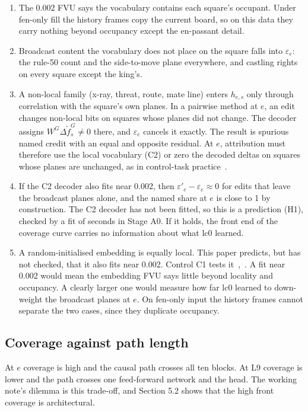 \documentclass[conference]{IEEEtran}
\begin{document}
\begin{enumerate}
\item The 0.002 FVU says the vocabulary contains each square's occupant. Under fen-only fill the history frames copy the current board, so on this data they carry nothing beyond occupancy except the en-passant detail.
\item Broadcast content the vocabulary does not place on the square falls into $\varepsilon_e$: the rule-50 count and the side-to-move plane everywhere, and castling rights on every square except the king's.
\item A non-local family (x-ray, threat, route, mate line) enters $h_{e,s}$ only through correlation with the square's own planes. In a pairwise method at $e$, an edit changes non-local bits on squares whose planes did not change. The decoder assigns $W^G\Delta\tilde f^G_s\neq0$ there, and $\varepsilon_e$ cancels it exactly. The result is spurious named credit with an equal and opposite residual. At $e$, attribution must therefore use the local vocabulary (C2) or zero the decoded deltas on squares whose planes are unchanged, as in control-task practice~\cite{hewitt2019}.
\item If the C2 decoder also fits near 0.002, then $\varepsilon'_e-\varepsilon_e\approx0$ for edits that leave the broadcast planes alone, and the named share at $e$ is close to 1 by construction. The C2 decoder has not been fitted, so this is a prediction (H1), checked by a fit of seconds in Stage A0. If it holds, the front end of the coverage curve carries no information about what lc0 learned.
\item A random-initialised embedding is equally local. This paper predicts, but has not checked, that it also fits near 0.002. Control C1 tests it~\cite{adebayo2018},~\cite{sutter2025}. A fit near 0.002 would mean the embedding FVU says little beyond locality and occupancy. A clearly larger one would measure how far lc0 learned to down-weight the broadcast planes at $e$. On fen-only input the history frames cannot separate the two cases, since they duplicate occupancy.
\end{enumerate}

\subsection{Coverage against path length}\label{sec:5.3}
At $e$ coverage is high and the causal path crosses all ten blocks. At L9 coverage is lower and the path crosses one feed-forward network and the head. The working note's dilemma is this trade-off, and Section 5.2 shows that the high front coverage is architectural.
\end{document}

